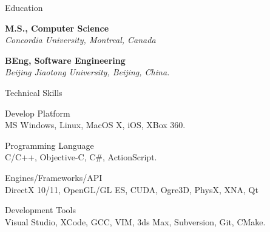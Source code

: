 \documentclass[10pt]{article}
\newenvironment{mydescription}{%
    \begin{description}
        \setlength{\itemsep}{0.25em}%
        \setlength{\parsep}{0em}%
        \setlength{\topsep}{\itemsep}%
        \setlength{\parskip}{0em}%
        \setlength{\labelwidth}{0.1em}
        \setlength{\labelsep}{0em} 
    }%
{\end{description}}
\begin{document}
\begin{cv}
\begin{cvlist}{Education}
    \item   \textbf{M.S., Computer Science}  \\ 
            \emph{Concordia University, Montreal, Canada}
    \item   \textbf{BEng, Software Engineering} \\
            \emph{Beijing Jiaotong University, Beijing, China.}
\end{cvlist}

\begin{cvlist}{Technical Skills}
\item
    \begin{mydescription} 
        \item[Develop Platform] \hfill \\
            MS Windows, Linux, MacOS X, iOS, XBox 360.
        \item[Programming Language] \hfill \\
            C/C++, Objective-C, C\#, ActionScript.  
        \item [Engines/Frameworks/API] \hfill \\
             DirectX 10/11, OpenGL/GL ES, CUDA, Ogre3D, PhysX, XNA, Qt
        \item[Development Tools] \hfill \\
            Visual Studio, XCode, GCC, VIM, 3ds Max, Subversion, Git, CMake.
    \end{mydescription} 
\end{cvlist} 





\end{cv}
\end{document}
